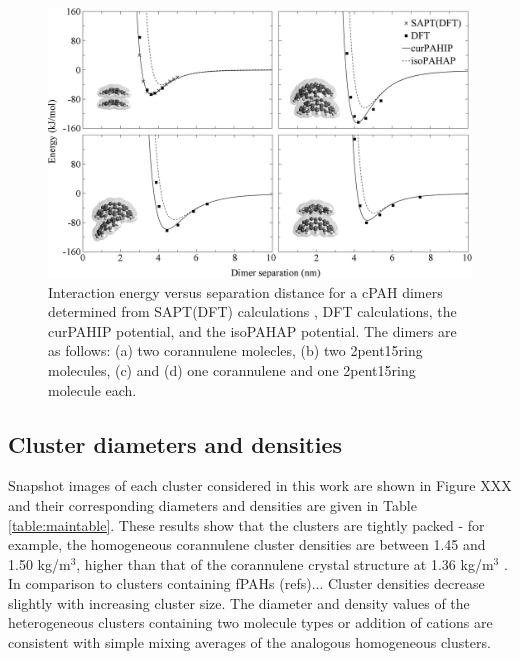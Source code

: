 %
\begin{figure}[!tbh]
\centering
\includegraphics[width=1\linewidth]{Figures/potentialDFT_curves.eps}
\caption{Interaction energy versus separation distance for a cPAH dimers determined from SAPT(DFT) calculations \cite{Cabaleiro-Lago2018}, DFT calculations, the curPAHIP potential, and the isoPAHAP potential. The dimers are as follows: (a) two corannulene molecles, (b) two 2pent15ring molecules, (c) and (d) one corannulene and one 2pent15ring molecule each.}
\label{fig:potentialDFTcurves}
\end{figure}
%

\subsection{Cluster diameters and densities}

Snapshot images of each cluster considered in this work are shown in Figure XXX and their corresponding diameters and densities are given in Table \ref{table:maintable}.  %
These results show that the clusters are tightly packed - for example, the homogeneous corannulene cluster densities are between 1.45 and 1.50 kg/$\text{m}^{3}$, higher than that of the corannulene crystal structure at 1.36 kg/$\text{m}^{3}$ \cite{CORANN11unitcell}. In comparison to clusters containing fPAHs (refs)... %
Cluster densities decrease slightly with increasing cluster size.
The diameter and density values of the heterogeneous clusters containing two molecule types or addition of cations are consistent with simple mixing averages of the analogous homogeneous clusters. %

